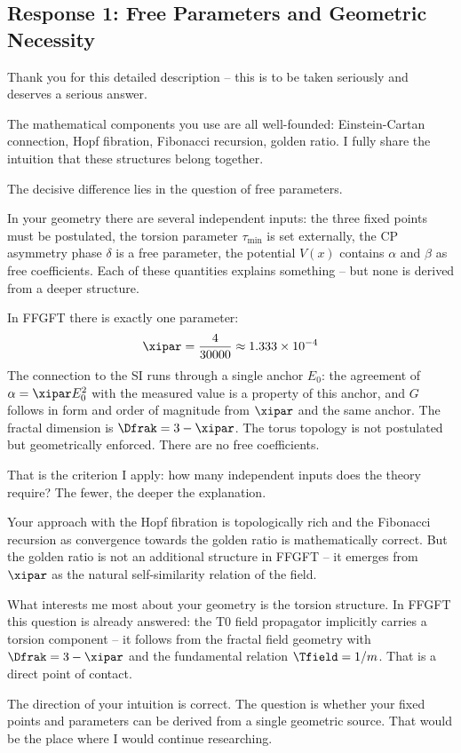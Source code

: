 \subsection{Response 1: Free Parameters and Geometric Necessity}

\begin{response}
Thank you for this detailed description -- this is to be taken seriously and deserves a serious answer.

The mathematical components you use are all well-founded: Einstein-Cartan connection, Hopf fibration, Fibonacci recursion, golden ratio. I fully share the intuition that these structures belong together.

The decisive difference lies in the question of free parameters.

In your geometry there are several independent inputs: the three fixed points must be postulated, the torsion parameter $\tau_{\min}$ is set externally, the CP asymmetry phase $\delta$ is a free parameter, the potential $V(x)$ contains $\alpha$ and $\beta$ as free coefficients. Each of these quantities explains something -- but none is derived from a deeper structure.

In FFGFT there is exactly one parameter:
\begin{equation}
  \xipar = \frac{4}{30000} \approx 1.333 \times 10^{-4}
\end{equation}
The connection to the SI runs through a single anchor $E_0$: the agreement of $\alpha = \xipar E_0^2$ with the measured value is a property of this anchor, and $G$ follows in form and order of magnitude from $\xipar$ and the same anchor. The fractal dimension is $\Dfrak = 3 - \xipar$. The torus topology is not postulated but geometrically enforced. There are no free coefficients.

\medskip
That is the criterion I apply: how many independent inputs does the theory require? The fewer, the deeper the explanation.

\medskip
Your approach with the Hopf fibration is topologically rich and the Fibonacci recursion as convergence towards the golden ratio is mathematically correct. But the golden ratio is not an additional structure in FFGFT -- it emerges from $\xipar$ as the natural self-similarity relation of the field.

\medskip
What interests me most about your geometry is the torsion structure. In FFGFT this question is already answered: the T0 field propagator implicitly carries a torsion component -- it follows from the fractal field geometry with $\Dfrak = 3 - \xipar$ and the fundamental relation $\Tfield = 1/m$. That is a direct point of contact.

\medskip
The direction of your intuition is correct. The question is whether your fixed points and parameters can be derived from a single geometric source. That would be the place where I would continue researching.
\end{response}


